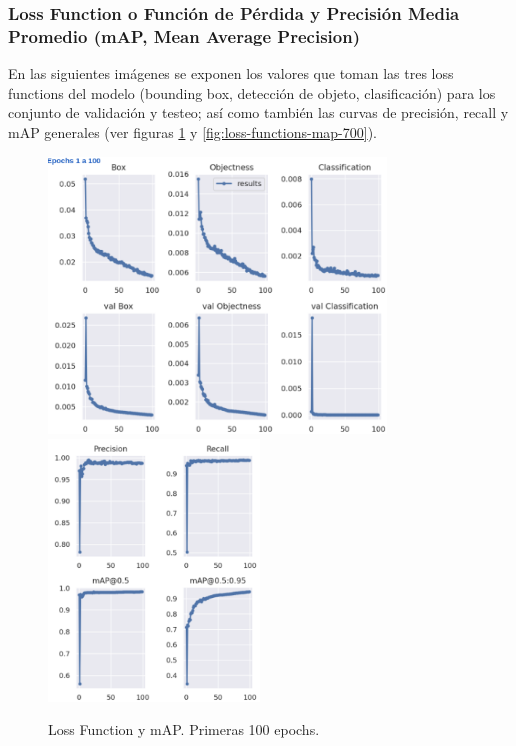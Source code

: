 \subsubsection{Loss Function o Función de Pérdida y Precisión Media Promedio (mAP, Mean Average Precision)}
En las siguientes imágenes se exponen los valores que toman las tres loss functions del modelo (bounding box, detección de objeto, clasificación) para los conjunto de validación y testeo; así como también las curvas de precisión, recall y mAP generales (ver figuras \ref{fig:loss-functions-map-100} y \ref{fig:loss-functions-map-700}).\\


\begin{figure}
    \centering
    \includegraphics[width=0.8\textwidth]{img/resultados_finales_100_part1.png}
    \includegraphics[width=0.5\textwidth]{img/resultados_finales_100_part2.png}
    \caption{Loss Function y mAP. Primeras 100 epochs.}
    \label{fig:loss-functions-map-100}
\end{figure}\\

